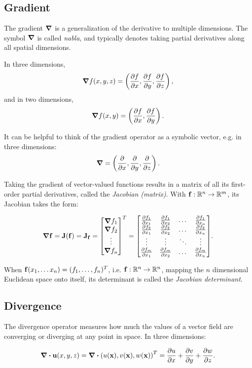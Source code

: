 \subsection*{Gradient}
The gradient $\grad$ is a generalization of the derivative to multiple
dimensions. The symbol $\grad$ is called \textit{nabla}, and typically denotes
taking partial derivatives along all spatial dimensions. 

In three dimensions, 
$$\grad f(x,y,z) = \left(\pdv{f}{x}, \pdv{f}{y}, \pdv{f}{z}\right),$$ 
and in two dimensions,
$$\grad f(x,y) = \left(\pdv{f}{x}, \pdv{f}{y}\right).$$

It can be helpful to think of the gradient operator as a symbolic
vector, e.g. in three dimensions:
$$\grad = \left(\pdv{x}, \pdv{y}, \pdv{z}\right).$$ 

Taking the gradient of vector-valued functions results in a matrix of all its
first-order partial derivatives, called the \textit{Jacobian (matrix)}. With
$\vb{f}: \mathbb{R}^n \to \mathbb{R}^m$, its Jacobian takes the form:

\begin{equation}\label{eq:jacobian-matrix}
\grad \vb{f} = \vb{J}(\vb{f}) = \vb{J}_{\vb{f}}=
\mqty[\grad{f_1}\\\grad{f_2}\\\vdots\\\grad f_n]^T = 
\mqty[
\pdv{f_1}{x_1} & \pdv{f_1}{x_2} & \dots & \pdv{f_1}{x_n}\\
\pdv{f_2}{x_1} & \pdv{f_2}{x_2} & \dots & \pdv{f_2}{x_n}\\
\vdots         &    \vdots      & \ddots & \vdots \\
\pdv{f_m}{x_1} & \pdv{f_m}{x_2} & \dots & \pdv{f_m}{x_n}
].
\end{equation}

When $\vb{f}(x_1,\dots x_n) = (f_1, \dots, f_n)^T$, i.e. $\vb{f}: \mathbb{R}^n
\to \mathbb{R}^n$, mapping the $n$ dimensional Euclidean space onto itself,
its determinant is called the \textit{Jacobian determinant}.

\subsection*{Divergence}
The divergence operator measures how much the values of a vector field are
converging or diverging at any point in space. In three dimensions:

$$\div{\vb{u}(x,y,z)} = \div(u(\vb{x}), v(\vb{x}), w(\vb{x}))^T = 
\pdv{u}{x}+\pdv{v}{y}+\pdv{w}{z}.$$

